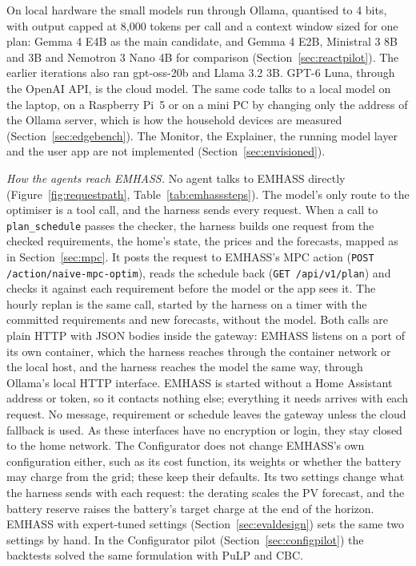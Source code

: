 \documentclass[12pt,a4paper]{report}
\begin{document}
On local hardware the small models run through Ollama, quantised to 4
bits, with output capped at 8,000 tokens per call and a context window
sized for one plan: Gemma 4 E4B as the main candidate, and Gemma 4 E2B,
Ministral 3 8B and 3B and Nemotron 3 Nano 4B for comparison
(Section~\ref{sec:reactpilot}). The earlier iterations also ran
gpt-oss-20b and Llama 3.2 3B.
GPT-6 Luna, through the OpenAI API, is the cloud model. The same code
talks to a local model on the laptop, on a
Raspberry Pi~5 or on a mini PC by changing only the address of the
Ollama server, which is how the household devices are measured
(Section~\ref{sec:edgebench}). The Monitor, the Explainer, the running
model layer and the user app are not implemented
(Section~\ref{sec:envisioned}).

\textit{How the agents reach EMHASS.} No agent talks to EMHASS
directly (Figure~\ref{fig:requestpath}, Table~\ref{tab:emhasssteps}). The model's only route to the optimiser is a tool call, and
the harness sends every request. When a call to \texttt{plan\_schedule}
passes the checker, the harness builds one request from the checked
requirements, the home's state, the prices and the forecasts, mapped as
in Section~\ref{sec:mpc}. It posts the request to EMHASS's MPC action
(\texttt{POST /action/naive-mpc-optim}), reads the schedule back
(\texttt{GET /api/v1/plan}) and checks it against each requirement
before the model or the app sees it. The hourly replan is the same
call, started by the harness on a timer with the committed requirements
and new forecasts, without the model. Both calls are plain HTTP with
JSON bodies inside the gateway: EMHASS listens on a port of its own
container, which the harness reaches through the container network or
the local host, and the harness reaches the model the same way, through
Ollama's local HTTP interface. EMHASS is started without a Home
Assistant address or token, so it contacts nothing else; everything it
needs arrives with each request. No message, requirement or schedule
leaves the gateway unless the cloud fallback is used. As these interfaces have no encryption or
login, they stay closed to the home network. The Configurator does not change
EMHASS's own configuration either, such as its cost function, its
weights or whether the battery may charge from the grid; these keep
their defaults. Its two settings change what the harness sends with
each request: the derating scales the PV forecast, and the battery
reserve raises the battery's target charge at the end of the horizon.
EMHASS with expert-tuned settings (Section~\ref{sec:evaldesign}) sets
the same two settings by hand. In the Configurator pilot
(Section~\ref{sec:configpilot}) the backtests solved the same
formulation with PuLP and CBC.
\end{document}
